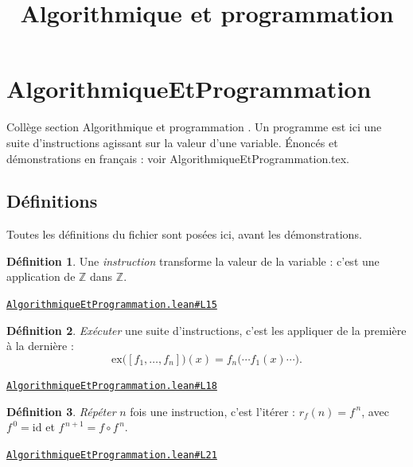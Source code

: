\documentclass[11pt,a4paper]{article}
\title{Algorithmique et programmation}
\date{}
\theoremstyle{definition}
\newtheorem{definition}{Définition}
\theoremstyle{plain}
\newcommand{\source}[2]{\par\smallskip\noindent\hfill{\footnotesize\href{#1}{\texttt{#2}}}\par\smallskip}
\begin{document}
\maketitle
\sloppy

\section{AlgorithmiqueEtProgrammation}

\noindent
Collège \textemdash{} section \og{} Algorithmique et programmation \fg{}.
Un programme est ici une suite d'instructions agissant sur la valeur d'une variable.
Énoncés et démonstrations en français : voir AlgorithmiqueEtProgrammation.tex.

\subsection{Définitions}

\noindent
Toutes les définitions du fichier sont posées ici, avant les démonstrations.

\begin{definition}
Une \emph{instruction} transforme la valeur de la variable : c'est une
application de $\mathbb{Z}$ dans $\mathbb{Z}$.
\end{definition}
\source{https://github.com/Commutator-IO/learn-lean/blob/main/cours/01-college/07-algorithmique-et-programmation/AlgorithmiqueEtProgrammation.lean\#L15}{AlgorithmiqueEtProgrammation.lean\#L15}

\begin{definition}
\emph{Exécuter} une suite d'instructions, c'est les appliquer de la première à la
dernière :
\[ \mathrm{ex}\bigl([f_1, \dots, f_n]\bigr)(x) = f_n\bigl(\cdots f_1(x) \cdots\bigr) . \]
\end{definition}
\source{https://github.com/Commutator-IO/learn-lean/blob/main/cours/01-college/07-algorithmique-et-programmation/AlgorithmiqueEtProgrammation.lean\#L18}{AlgorithmiqueEtProgrammation.lean\#L18}

\begin{definition}
\emph{Répéter} $n$ fois une instruction, c'est l'itérer : $r_f(n) = f^{\,n}$, avec
$f^{\,0} = \mathrm{id}$ et $f^{\,n+1} = f \circ f^{\,n}$.
\end{definition}
\source{https://github.com/Commutator-IO/learn-lean/blob/main/cours/01-college/07-algorithmique-et-programmation/AlgorithmiqueEtProgrammation.lean\#L21}{AlgorithmiqueEtProgrammation.lean\#L21}
\end{document}
